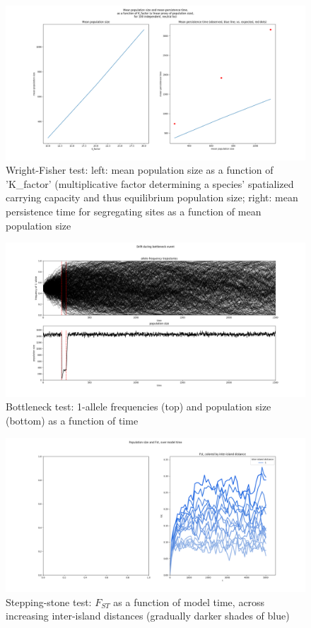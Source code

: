 ﻿\documentclass{article}
\begin{document}
\begin{figure}[h!]
\includegraphics[width=175mm]{./img/validation/wf/pop_size_vs_K_factor_and_mean_persist_t_vs_pop_size.png}
        \caption{Wright-Fisher test: left: mean population size as a function of 'K\_factor' (multiplicative factor determining a species' spatialized carrying capacity and thus equilibrium population size; right: mean persistence time for segregating sites as a function of mean population size}
\end{figure}


\begin{figure}[h!]
\includegraphics[width=175mm]{./img/validation/bottleneck/alleles_seem_to_take_too_long_to_fix.png}
        \caption{Bottleneck test: 1-allele frequencies (top) and population size (bottom) as a function of time}
\end{figure}


\begin{figure}[h!]
\includegraphics[width=175mm]{./img/validation/stepping_stone/Fst_over_time_vs_interisland_dist.png}
        \caption{Stepping-stone test: $F_{ST}$ as a function of model time, across increasing inter-island distances (gradually darker shades of blue)}
\end{figure}
\end{document}
